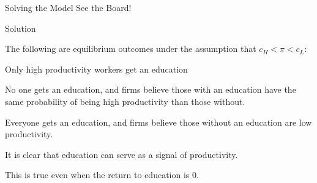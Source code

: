\documentclass[aspectratio=169,usenames,dvipsnames]{beamer}
\newenvironment{wideitemize}{\itemize\addtolength{\itemsep}{10pt}}{\enditemize}
\begin{document}

    
    
\begin{frame}{Solving the Model}
\Huge See the Board!
    
\end{frame}

\begin{frame}{Solution}

\begin{theorem}
    The following are equilibrium outcomes under the assumption that $c_H<\pi < c_L$:
    \begin{wideitemize}
        \item Only high productivity workers get an education
        \item No one gets an education, and firms believe those with an education have the same probability of being high productivity than those without.
        \item Everyone gets an education, and firms believe those without an education are low productivity.
    \end{wideitemize}
\end{theorem}
    \begin{wideitemize}
        \item It is clear that education can serve as a signal of productivity.
        \item This is true even when the return to education is 0.
    \end{wideitemize}
\end{frame}
\end{document}
